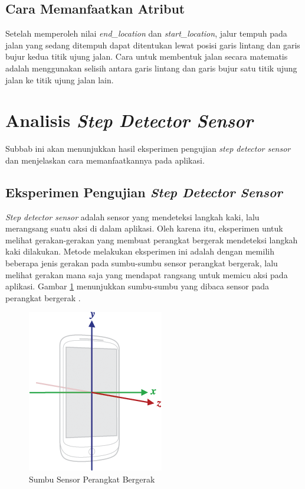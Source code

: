 \subsection{Cara Memanfaatkan Atribut}
\label{subs:directions-attr-use}
Setelah memperoleh nilai \textit{end\_location} dan \textit{start\_location}, jalur tempuh pada jalan yang sedang ditempuh dapat ditentukan lewat posisi garis lintang dan garis bujur kedua titik ujung jalan. Cara untuk membentuk jalan secara matematis adalah menggunakan selisih antara garis lintang dan garis bujur satu titik ujung jalan ke titik ujung jalan lain. 

\section{Analisis \textit{Step Detector Sensor}}
Subbab ini akan menunjukkan hasil eksperimen pengujian \textit{step detector sensor} dan menjelaskan cara memanfaatkannya pada aplikasi. 

\subsection{Eksperimen Pengujian \textit{Step Detector Sensor}}
\textit{Step detector sensor} adalah sensor yang mendeteksi langkah kaki, lalu merangsang suatu aksi di dalam aplikasi. Oleh karena itu, eksperimen untuk melihat gerakan-gerakan yang membuat perangkat bergerak mendeteksi langkah kaki dilakukan. Metode melakukan eksperimen ini adalah dengan memilih beberapa jenis gerakan pada sumbu-sumbu sensor perangkat bergerak, lalu melihat gerakan mana saja yang mendapat rangsang untuk memicu aksi pada aplikasi. Gambar \ref{fig:axis-device} menunjukkan sumbu-sumbu yang dibaca sensor pada perangkat bergerak \cite{motion-sensor}. 

\begin{figure}[h]
	\centering	\includegraphics[scale=1]
	{Gambar/axis-device.png}
	\caption{Sumbu Sensor Perangkat Bergerak}
	\label{fig:axis-device}
\end{figure}

